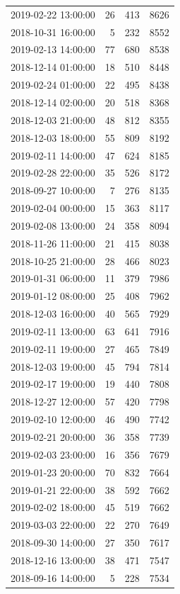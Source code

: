 \begin{tabular}{lrrr}
2019-02-22 13:00:00 & 26 & 413 & 8626 \\
2018-10-31 16:00:00 & 5 & 232 & 8552 \\
2019-02-13 14:00:00 & 77 & 680 & 8538 \\
2018-12-14 01:00:00 & 18 & 510 & 8448 \\
2019-02-24 01:00:00 & 22 & 495 & 8438 \\
2018-12-14 02:00:00 & 20 & 518 & 8368 \\
2018-12-03 21:00:00 & 48 & 812 & 8355 \\
2018-12-03 18:00:00 & 55 & 809 & 8192 \\
2019-02-11 14:00:00 & 47 & 624 & 8185 \\
2019-02-28 22:00:00 & 35 & 526 & 8172 \\
2018-09-27 10:00:00 & 7 & 276 & 8135 \\
2019-02-04 00:00:00 & 15 & 363 & 8117 \\
2019-02-08 13:00:00 & 24 & 358 & 8094 \\
2018-11-26 11:00:00 & 21 & 415 & 8038 \\
2018-10-25 21:00:00 & 28 & 466 & 8023 \\
2019-01-31 06:00:00 & 11 & 379 & 7986 \\
2019-01-12 08:00:00 & 25 & 408 & 7962 \\
2018-12-03 16:00:00 & 40 & 565 & 7929 \\
2019-02-11 13:00:00 & 63 & 641 & 7916 \\
2019-02-11 19:00:00 & 27 & 465 & 7849 \\
2018-12-03 19:00:00 & 45 & 794 & 7814 \\
2019-02-17 19:00:00 & 19 & 440 & 7808 \\
2018-12-27 12:00:00 & 57 & 420 & 7798 \\
2019-02-10 12:00:00 & 46 & 490 & 7742 \\
2019-02-21 20:00:00 & 36 & 358 & 7739 \\
2019-02-03 23:00:00 & 16 & 356 & 7679 \\
2019-01-23 20:00:00 & 70 & 832 & 7664 \\
2019-01-21 22:00:00 & 38 & 592 & 7662 \\
2019-02-02 18:00:00 & 45 & 519 & 7662 \\
2019-03-03 22:00:00 & 22 & 270 & 7649 \\
2018-09-30 14:00:00 & 27 & 350 & 7617 \\
2018-12-16 13:00:00 & 38 & 471 & 7547 \\
2018-09-16 14:00:00 & 5 & 228 & 7534 \\

\end{tabular}
